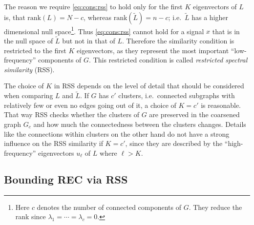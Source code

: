 The reason we require \cref{eq:cons:rss} to hold only for the first $K$ eigenvectors of $L$ is, that $\text{rank}(L) = N - c$, whereas $\text{rank}(\widetilde{L}) = n - c$;
i.e.\ $\widetilde{L}$ has a higher dimensional null space\footnote{%
	Here $c$ denotes the number of connected components of $G$.
	They reduce the rank since $\lambda_1 = \cdots = \lambda_c = 0$.
}.
Thus \cref{eq:cons:rss} cannot hold for a signal $x$ that is in the null space of $\widetilde{L}$ but not in that of $L$.
Therefore the similarity condition is restricted to the first $K$ eigenvectors, as they represent the most important ``low-frequency'' components of $G$.
This restricted condition is called \textit{restricted spectral similarity} (RSS).

The choice of $K$ in RSS depends on the level of detail that should be considered when comparing $L$ and $\widetilde{L}$.
If $G$ has $c'$ clusters, i.e.\ connected subgraphs with relatively few or even no edges going out of it, a choice of $K = c'$ is reasonable.
That way RSS checks whether the clusters of $G$ are preserved in the coarsened graph $G_c$ and how much the connectedness between the clusters changes.
Details like the connections within clusters on the other hand do not have a strong influence on the RSS similarity if $K = c'$, since they are described by the ``high-frequency'' eigenvectors $u_\ell$ of $L$ where $\ell > K$.

\subsection{Bounding REC via RSS}%
\label{sec:cons:bound}

